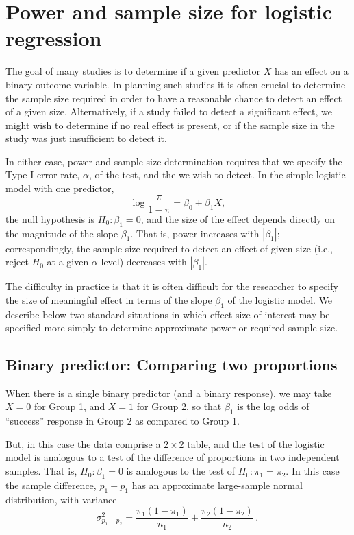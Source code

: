 \section{Power and sample size for logistic regression} \label{sec:logistic-power}

The goal of many studies is to determine if a given predictor $X$ has
an effect on a binary outcome variable.
In planning such studies it is often crucial to determine the sample
size required in order to have a reasonable chance to detect an effect
of a given size.  Alternatively, if a study failed to detect a significant
effect, we might wish to determine if no real effect is present, or if
the sample size in the study was just insufficient to detect it.

In either case, power and sample size determination requires that we specify the Type I error rate, $\alpha$, of the test, and the 
we wish to detect.  In the simple logistic model with one predictor,
\begin{equation*}
 \log \frac{\pi}{1-\pi} = \beta_0 + \beta_1 X
 \comma
\end{equation*}
the null hypothesis is $H_0 : \beta_1 = 0$, and the size of the effect
depends directly on the magnitude of the slope $\beta_1$.
That is, power increases with $| \beta_1 |$;  correspondingly, the sample
size required to detect an effect of given size (i.e., reject $H_0$ at
a given $\alpha$-level)
decreases with $| \beta_1 |$.

The difficulty in practice is that it is often difficult for the
researcher to specify the size of meaningful effect in terms of the
slope $\beta_1$ of the logistic model.
We describe below two standard situations in which effect size of interest
may be specified more simply to determine approximate power or
required sample size.

\subsection{Binary predictor: Comparing two proportions}
When there is a single binary predictor (and a binary response),
we may take $X=0$ for Group 1, and $X=1$ for Group 2,
so that $\beta_1$ is the log odds of ``success'' response in Group 2
as compared to Group 1.  

But, in this case
the data comprise a $2\times 2$ table, and the test of the logistic model
is analogous to a test of the difference of proportions in
two independent samples.  That is, $H_0 : \beta_1 = 0$ is
analogous to the test of $H_0 : \pi_1 = \pi_2$.
In this case the sample difference, $p_1 - p_1$
has an approximate large-sample normal distribution, with variance
\begin{equation*}
 \sigma_{p_1 - p_2}^2 = \frac{\pi_1 (1 - \pi_1)}{n_1} +
 \frac{\pi_2 (1 - \pi_2)}{n_2}
 \period
\end{equation*}

